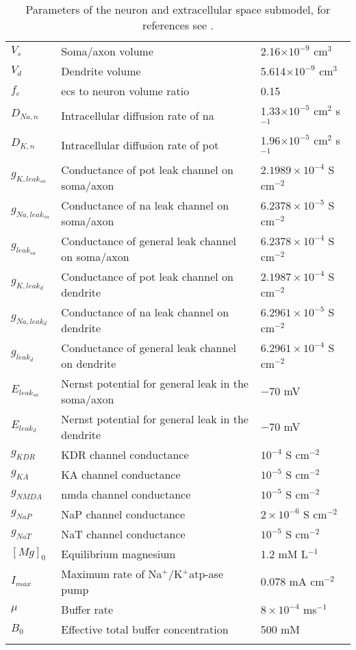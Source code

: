 \documentclass[11pt]{elsarticle}
\newcommand{\sodpot}{Na$^+$/K$^+$\xspace}
\newcommand{\mAcm}{mA cm$^{-2}$\xspace}
\newcommand{\n}{$^{-1}$\xspace}
\newcommand{\e}[1]{\times 10^{#1}}
\newcommand{\psec}{s$^{-1}$\xspace}
\newcommand{\na}{\gls{na}\xspace}
\newcommand{\pot}{\gls{pot}\xspace}
\begin{document}
\begin{longtable}[h!]{ p{0.12\linewidth}   p{0.6\linewidth}   p{0.28\linewidth} }
$V_s$ 		& Soma/axon volume			& 2.16$\times 10^{-9}$ cm$^3$ 		\\
$V_d$ 		& Dendrite volume		& 5.614$\times 10^{-9}$ cm$^3$ 		 \\
$f_e$		& \gls{ecs} to neuron volume ratio	& 0.15								 \\
$D_{Na, n}$	& Intracellular diffusion rate of \na 		& 1.33$\times 10^{-5}$ cm$^2$ \psec		\\
$D_{K,n}$		& Intracellular diffusion rate of \pot 		& 1.96$\times 10^{-5}$ cm$^2$ \psec		 \\
$g_{K,leak_{sa}}$ & Conductance of \pot leak channel on soma/axon	&  $2.1989\e{-4}$ S cm$^{-2}$ \\		
$g_{Na,leak_{sa}}$ & Conductance of \na leak channel on soma/axon	& $6.2378\e{-5}$  S cm$^{-2}$\\	
$g_{leak_{sa}}$ 	& Conductance of general leak channel on soma/axon		&  $6.2378\e{-4}$ S cm$^{-2}$  \\	
$g_{K,leak_{d}}$ 	& Conductance of \pot leak channel on dendrite	&  $2.1987\e{-4}$  S cm$^{-2}$ \\	
$g_{Na,leak_{d}}$ 	& Conductance of \na leak channel on dendrite	&  $6.2961\e{-5}$  S cm$^{-2}$ \\	
$g_{leak_{d}}$ 		& Conductance of general leak channel on dendrite	&  $6.2961\e{-4}$ S cm$^{-2}$  \\			
$E_{leak_{sa}}$			& Nernst potential for general leak in the soma/axon			& $-70$ mV				 \\
$E_{leak_{d}}$			& Nernst potential for general leak in the dendrite			& $-70$ mV	 \\				
$g_{KDR}$ 		& KDR channel conductance		& $10^{-4}$  S cm$^{-2}$  \\		
$g_{KA}$ 		& KA channel conductance		& $10^{-5}$  S cm$^{-2}$  \\		
$g_{NMDA}$ 		& \gls{nmda} channel conductance		& $10^{-5}$ S cm$^{-2}$  \\		
$g_{NaP}$ 		& NaP channel conductance		& $2\e{-6}$   S cm$^{-2}$ \\					
$g_{NaT}$ 		& NaT channel conductance		& $10^{-5}$  S cm$^{-2}$ \\
$[Mg]_0$ 		& Equilibrium magnesium 		& 1.2 mM L\n  \\		
$I_{max}$ 		& Maximum rate of \sodpot \gls{atp}-ase pump		& $0.078$ \mAcm  \\		
$\mu$ 		& Buffer rate											& $8\times10^{-4}$ m\psec 		 \\
$B_0$		& Effective total buffer concentration 		& 500 mM \\
				\hline
\caption{Parameters of the neuron and extracellular space submodel, for references see \citet{Mathias2017}.}
\end{longtable}
%
\end{document}
